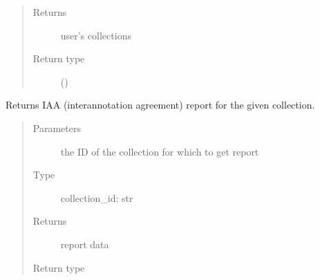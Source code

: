 \documentclass[letterpaper,10pt,english]{sphinxmanual}
\begin{document}
\begin{fulllineitems}
\begin{fulllineitems}
\begin{quote}
\begin{description}
\begin{itemize}
\end{itemize}

\item[{Returns}] \leavevmode
\sphinxAtStartPar
user’s collections

\item[{Return type}] \leavevmode
\sphinxAtStartPar
{}()

\end{description}\end{quote}

\end{fulllineitems}


\begin{fulllineitems}
\label{\detokenize{autoapi/pine/client/index:pine.client.PineClient.get_collection_iaa_report}}
\sphinxAtStartPar
Returns IAA (inter\sphinxhyphen{}annotation agreement) report for the given collection.
\begin{quote}\begin{description}
\item[{Parameters}] \leavevmode
\sphinxAtStartPar
{} \textendash{} the ID of the collection for which to get report

\item[{Type}] \leavevmode
\sphinxAtStartPar
collection\_id: str

\item[{Returns}] \leavevmode
\sphinxAtStartPar
report data

\item[{Return type}] \leavevmode
\sphinxAtStartPar
{}

\end{description}\end{quote}

\end{fulllineitems}


\end{fulllineitems}
\end{document}
